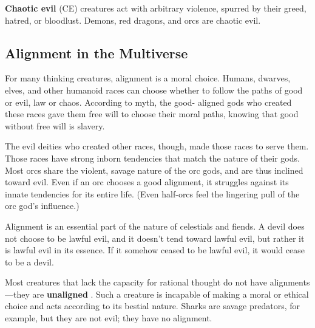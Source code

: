 \documentclass[
]{article}
\begin{document}
\textbf{Chaotic evil} (CE) creatures act with arbitrary violence,
spurred by their greed, hatred, or bloodlust. Demons, red dragons, and
orcs are chaotic evil.

\hypertarget{alignment-in-the-multiverse}{%
\subsection{Alignment in the
Multiverse}\label{alignment-in-the-multiverse}}

For many thinking creatures, alignment is a moral choice. Humans,
dwarves, elves, and other humanoid races can choose whether to follow
the paths of good or evil, law or chaos. According to myth, the good-
aligned gods who created these races gave them free will to choose their
moral paths, knowing that good without free will is slavery.

The evil deities who created other races, though, made those races to
serve them. Those races have strong inborn tendencies that match the
nature of their gods. Most orcs share the violent, savage nature of the
orc gods, and are thus inclined toward evil. Even if an orc chooses a
good alignment, it struggles against its innate tendencies for its
entire life. (Even half-orcs feel the lingering pull of the orc god's
influence.)

Alignment is an essential part of the nature of celestials and fiends. A
devil does not choose to be lawful evil, and it doesn't tend toward
lawful evil, but rather it is lawful evil in its essence. If it somehow
ceased to be lawful evil, it would cease to be a devil.

Most creatures that lack the capacity for rational thought do not have
alignments---they are \textbf{unaligned} . Such a creature is incapable
of making a moral or ethical choice and acts according to its bestial
nature. Sharks are savage predators, for example, but they are not evil;
they have no alignment.
\end{document}
